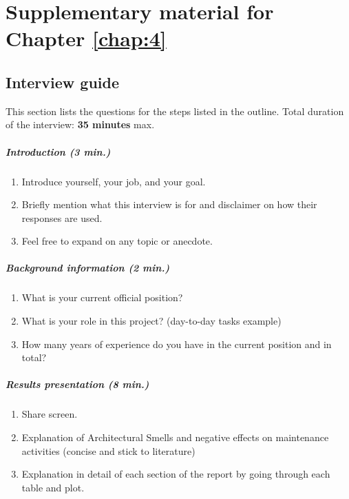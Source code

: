 \chapter{Supplementary material for Chapter \ref{chap:4}}
\section{Interview guide}\label{c4:appendix:interview-guide}
This section lists the questions for the steps listed in the outline.
Total duration of the interview: \textbf{35 minutes} max.

\paragraph{Introduction (3 min.)}
\begin{enumerate}
    \item Introduce yourself, your job, and your goal.
    \item Briefly mention what this interview is for and disclaimer on how their responses are used.
    \item Feel free to expand on any topic or anecdote.
\end{enumerate}

\paragraph{Background information (2 min.)}
\begin{enumerate}[resume]
    \item What is your current official position?
    \item What is your role in this project? (day-to-day tasks example)
    \item How many years of experience do you have in the current position and in total?
\end{enumerate}

\paragraph{Results presentation (8 min.)}
\begin{enumerate}[resume]
    \item Share screen.
    \item Explanation of Architectural Smells and negative effects on maintenance activities (concise and stick to literature)
    \item Explanation in detail of each section of the report by going through each table and plot.
\end{enumerate}

